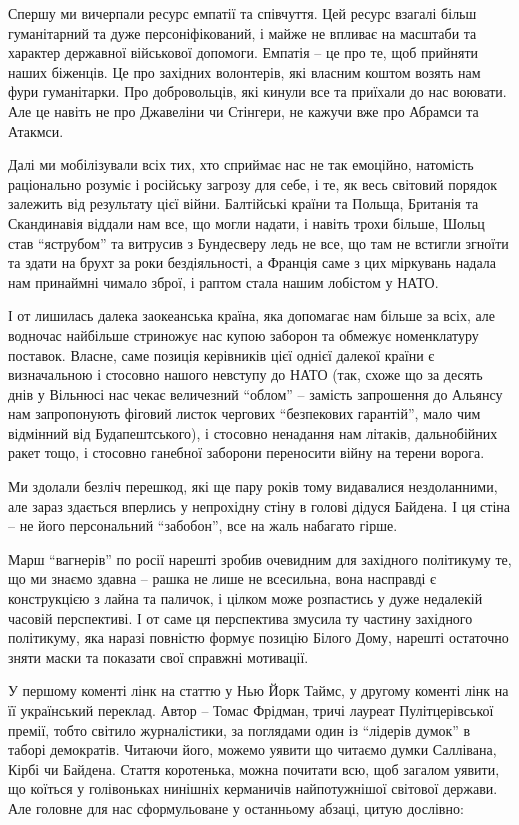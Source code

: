 Спершу ми вичерпали ресурс емпатії та співчуття. Цей ресурс взагалі більш
гуманітарний та дуже персоніфікований, і майже не впливає на масштаби та
характер державної військової допомоги. Емпатія – це про те, щоб прийняти наших
біженців. Це про західних волонтерів, які власним коштом возять нам фури
гуманітарки. Про добровольців, які кинули все та приїхали до нас воювати. Але
це навіть не про Джавеліни чи Стінгери, не кажучи вже про Абрамси та Атакмси.

Далі ми мобілізували всіх тих, хто сприймає нас не так емоційно, натомість
раціонально розуміє і російську загрозу для себе, і те, як весь світовий
порядок залежить від результату цієї війни. Балтійські країни та Польща,
Британія та Скандинавія віддали нам все, що могли надати, і навіть трохи
більше, Шольц став \enquote{яструбом} та витрусив з Бундесверу ледь не все, що там не
встигли згноїти та здати на брухт за роки бездіяльності, а Франція саме з цих
міркувань надала нам принаймні чимало зброї, і раптом стала нашим лобістом у
НАТО.

І от лишилась далека заокеанська країна, яка допомагає нам більше за всіх, але
водночас найбільше стриножує нас купою заборон та обмежує номенклатуру
поставок. Власне, саме позиція керівників цієї однієї далекої країни є
визначальною і стосовно нашого невступу до НАТО (так, схоже що за десять днів у
Вільнюсі нас чекає величезний \enquote{облом} – замість запрошення до Альянсу нам
запропонують фіговий листок чергових \enquote{безпекових гарантій}, мало чим відмінний
від Будапештського), і стосовно ненадання нам літаків, дальнобійних ракет тощо,
і стосовно ганебної заборони переносити війну на терени ворога.

Ми здолали безліч перешкод, які ще пару років тому видавалися нездоланними, але
зараз здається вперлись у непрохідну стіну в голові дідуся Байдена. І ця стіна
– не його персональний \enquote{забобон}, все на жаль набагато гірше.

Марш \enquote{вагнерів} по росії нарешті зробив очевидним для західного політикуму те,
що ми знаємо здавна – рашка не лише не всесильна, вона насправді є конструкцією
з лайна та паличок, і цілком може розпастись у дуже недалекій часовій
перспективі. І от саме ця перспектива змусила ту частину західного політикуму,
яка наразі повністю формує позицію Білого Дому, нарешті остаточно зняти маски
та показати свої справжні мотивації.

У першому коменті лінк на статтю у Нью Йорк Таймс, у другому коменті  лінк на
її український переклад. Автор – Томас Фрідман, тричі лауреат Пулітцерівської
премії, тобто світило журналістики, за поглядами один із \enquote{лідерів думок} в
таборі демократів. Читаючи його, можемо уявити що читаємо думки Саллівана,
Кірбі чи Байдена. Стаття коротенька, можна почитати всю, щоб загалом уявити, що
коїться у голівоньках нинішніх керманичів найпотужнішої світової держави. Але
головне для нас сформульоване у останньому абзаці, цитую дослівно:

